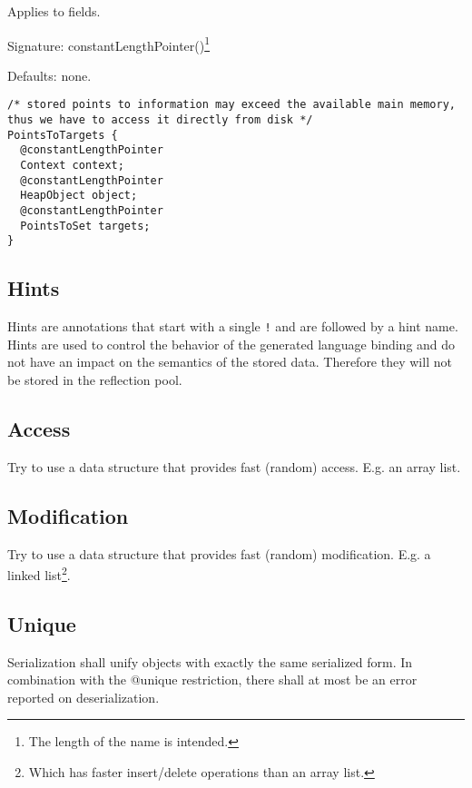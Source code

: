 Applies to fields.

Signature: constantLengthPointer()\footnote{The length of the name is intended.}

Defaults: none.

\begin{lstlisting}[label=constantLengthPointerExample,caption=Examples,language=skill]
/* stored points to information may exceed the available main memory, thus we have to access it directly from disk */
PointsToTargets {
  @constantLengthPointer
  Context context;
  @constantLengthPointer
  HeapObject object;
  @constantLengthPointer
  PointsToSet targets;
}
\end{lstlisting}




\subsection{Hints}
\label{hints}

Hints are annotations that start with a single \verb/!/ and are followed by a hint name. Hints are used to control the behavior of the generated language binding and do not have an impact on the semantics of the stored data. Therefore they will not be stored in the reflection pool.

\subsection*{Access}
Try to use a data structure that provides fast (random) access. E.g. an array list.

\subsection*{Modification}
Try to use a data structure that provides fast (random) modification. E.g. a linked list\footnote{Which has faster insert/delete operations than an array list.}.

\subsection*{Unique}
Serialization shall unify objects with exactly the same serialized form. In combination with the @unique restriction, there shall at most be an error reported on deserialization.

